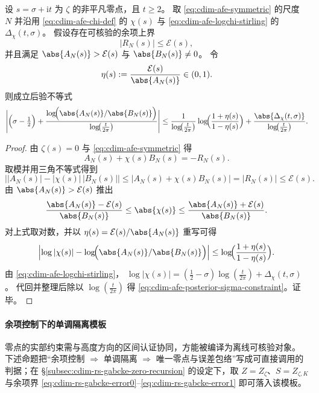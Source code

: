 \begin{theorem}[对称近似函数方程诱导的后验实部约束]\label{thm:cdim-afe-posterior-sigma-constraint}
设 \(s=\sigma+\mathrm{i}t\) 为 \(\zeta\) 的非平凡零点，且 \(t\ge 2\)。
取 \eqref{eq:cdim-afe-symmetric} 的尺度 \(N\) 并沿用 \eqref{eq:cdim-afe-chi-def} 的 \(\chi(s)\) 与 \eqref{eq:cdim-afe-logchi-stirling} 的 \(\Delta_\chi(t,\sigma)\)。
假设存在可核验的余项上界
\[
|R_N(s)|\le \mathcal{E}(s),
\]
并且满足 \(\abs{A_N(s)}>\mathcal{E}(s)\) 与 \(\abs{B_N(s)}\neq 0\)。
令
\[
\eta(s):=\frac{\mathcal{E}(s)}{\abs{A_N(s)}}\in(0,1).
\]
则成立后验不等式
\begin{equation}\label{eq:cdim-afe-posterior-sigma-constraint}
\Biggl|
\Bigl(\sigma-\tfrac12\Bigr)
+
\frac{\log\!\Bigl(\abs{A_N(s)}/\abs{B_N(s)}\Bigr)}{\log\!\bigl(\tfrac{t}{2\pi}\bigr)}
\Biggr|
\le
\frac{1}{\log\!\bigl(\tfrac{t}{2\pi}\bigr)}
\log\!\Bigl(\frac{1+\eta(s)}{1-\eta(s)}\Bigr)
+
\frac{\abs{\Delta_\chi(t,\sigma)}}{\log\!\bigl(\tfrac{t}{2\pi}\bigr)}.
\end{equation}
\end{theorem}
\begin{proof}
由 \(\zeta(s)=0\) 与 \eqref{eq:cdim-afe-symmetric} 得
\[
A_N(s)+\chi(s)B_N(s)=-R_N(s).
\]
取模并用三角不等式得到
\[
\bigl||A_N(s)|-|\chi(s)|\,|B_N(s)|\bigr|
\le |A_N(s)+\chi(s)B_N(s)|
=|R_N(s)|
\le \mathcal{E}(s).
\]
由 \(\abs{A_N(s)}>\mathcal{E}(s)\) 推出
\[
\frac{\abs{A_N(s)}-\mathcal{E}(s)}{\abs{B_N(s)}}\le \abs{\chi(s)}\le \frac{\abs{A_N(s)}+\mathcal{E}(s)}{\abs{B_N(s)}}.
\]
对上式取对数，并以 \(\eta(s)=\mathcal{E}(s)/\abs{A_N(s)}\) 重写可得
\[
\Bigl|\log|\chi(s)|-\log\!\Bigl(\abs{A_N(s)}/\abs{B_N(s)}\Bigr)\Bigr|
\le
\log\!\Bigl(\frac{1+\eta(s)}{1-\eta(s)}\Bigr).
\]
由 \eqref{eq:cdim-afe-logchi-stirling}，
\(
\log|\chi(s)|=(\tfrac12-\sigma)\log(\tfrac{t}{2\pi})+\Delta_\chi(t,\sigma)
\)。
代回并整理后除以 \(\log(\tfrac{t}{2\pi})\) 得 \eqref{eq:cdim-afe-posterior-sigma-constraint}。证毕。
\end{proof}

\paragraph{余项控制下的单调隔离模板}
零点的实部约束需与高度方向的区间认证协同，方能被编译为离线可核验对象。
下述命题把“余项控制 \(\Rightarrow\) 单调隔离 \(\Rightarrow\) 唯一零点与误差包络”写成可直接调用的判据；在 \S\ref{subsec:cdim-rs-gabcke-zero-recursion} 的设定下，取 \(Z=Z_\zeta\)、\(S=Z_{\zeta,K}\) 与余项界 \eqref{eq:cdim-rs-gabcke-error0}--\eqref{eq:cdim-rs-gabcke-error1} 即可落入该模板。

